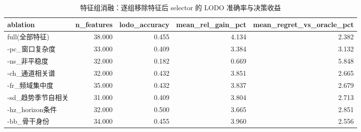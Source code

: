 \begin{table}[htbp]
\centering
\small
\caption{特征组消融：逐组移除特征后 selector 的 LODO 准确率与决策收益}
\label{tab:ablation_features}
\begin{tabular}{lrrrr}
\toprule
ablation & n\_features & lodo\_accuracy & mean\_rel\_gain\_pct & mean\_regret\_vs\_oracle\_pct \\
\midrule
full(全部特征) & 38.000 & 0.455 & 4.134 & 2.382 \\
-pc\_窗口复杂度 & 33.000 & 0.409 & 3.384 & 3.132 \\
-ns\_非平稳度 & 32.000 & 0.182 & 0.669 & 5.848 \\
-ch\_通道相关谱 & 32.000 & 0.432 & 3.851 & 2.665 \\
-fr\_频域集中度 & 35.000 & 0.432 & 3.837 & 2.679 \\
-sd\_趋势季节自相关 & 31.000 & 0.409 & 3.804 & 2.713 \\
-hz\_horizon条件 & 32.000 & 0.500 & 3.665 & 2.851 \\
-bb\_骨干身份 & 34.000 & 0.455 & 3.960 & 2.556 \\
\bottomrule
\end{tabular}
\end{table}

